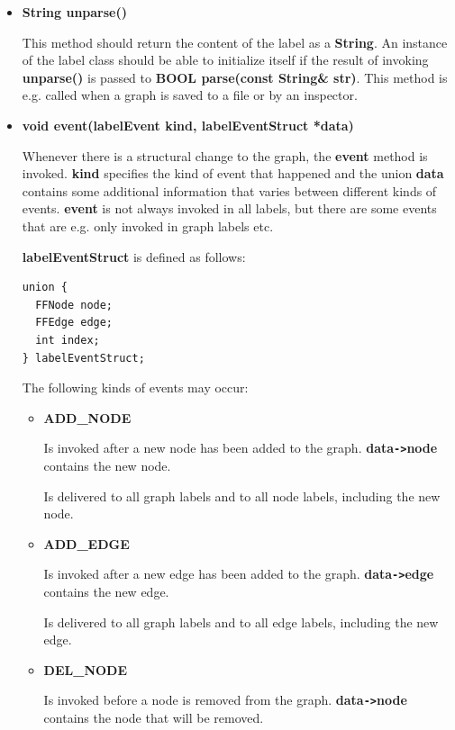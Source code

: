 \begin{itemize}
\item{\bf String unparse()}
  
  This method should return the content of the label as a {\bf
    String}. An instance of the label class should be able to
  initialize itself if the result of invoking {\bf unparse()} is
  passed to {\bf BOOL parse(const String\& str)}. This method is
  e.g. called when a graph is saved to a file or by an
  inspector.

\item{\bf void event(labelEvent kind, labelEventStruct *data)}
  
  Whenever there is a structural change to the graph, the {\bf
    event} method is invoked. {\bf kind} specifies the kind of
  event that happened and the union {\bf data} contains some
  additional information that varies between different kinds of
  events. {\bf event} is not always invoked in all labels, but
  there are some events that are e.g. only invoked in graph
  labels etc.

{\bf labelEventStruct} is defined as follows:

\bigskip

\begin{verbatim}
union {
  FFNode node;
  FFEdge edge;
  int index;
} labelEventStruct;
\end{verbatim}

\bigskip

The following kinds of events may occur:

\begin{itemize}

\item{\bf ADD\_NODE}
  
  Is invoked after a new node has been added to the graph. {\bf
    data\verb|->|node} contains the new node.
  
  Is delivered to all graph labels and to all node labels,
  including the new node.

\item{\bf ADD\_EDGE}
  
  Is invoked after a new edge has been added to the graph. {\bf
    data\verb|->|edge} contains the new edge.
  
  Is delivered to all graph labels and to all edge labels,
  including the new edge.

\item{\bf DEL\_NODE}
  
  Is invoked before a node is removed from the graph. {\bf
    data\verb|->|node} contains the node that will be removed.
  

\end{itemize}
\end{itemize}
